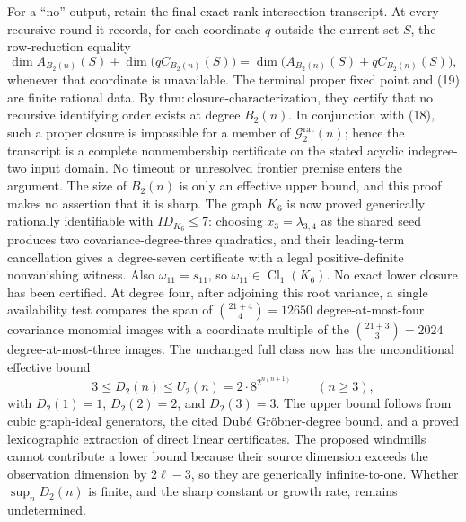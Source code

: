 For a ``no'' output, retain the final exact rank-intersection transcript.  At every recursive round it records, for each coordinate \(q\) outside the current set \(S\), the row-reduction equality
\[
 \dim A_{B_2(n)}(S)+
 \dim\bigl(qC_{B_2(n)}(S)\bigr)
 =\dim\bigl(A_{B_2(n)}(S)+qC_{B_2(n)}(S)\bigr), \tag{19}
\]
whenever that coordinate is unavailable.  The terminal proper fixed point and (19) are finite rational data.  By \(\mathrm{thm:closure\mbox{-}characterization}\), they certify that no recursive identifying order exists at degree \(B_2(n)\).  In conjunction with (18), such a proper closure is impossible for a member of \(\mathcal G_{2}^{\mathrm{rat}}(n)\); hence the transcript is a complete nonmembership certificate on the stated acyclic indegree-two input domain.  No timeout or unresolved frontier premise enters the argument.  The size of \(B_2(n)\) is only an effective upper bound, and this proof makes no assertion that it is sharp.
The graph \(K_6\) is now proved generically rationally identifiable with \(ID_{K_6}\leq7\): choosing \(x_3=\lambda_{3,4}\) as the shared seed produces two covariance-degree-three quadratics, and their leading-term cancellation gives a degree-seven certificate with a legal positive-definite nonvanishing witness.  Also \(\omega_{11}=s_{11}\), so \(\omega_{11}\in\operatorname{Cl}_1(K_6)\).  No exact lower closure has been certified.  At degree four, after adjoining this root variance, a single availability test compares the span of \(\binom{21+4}{4}=12650\) degree-at-most-four covariance monomial images with a coordinate multiple of the \(\binom{21+3}{3}=2024\) degree-at-most-three images.
The unchanged full class now has the unconditional effective bound
\[
 3\leq D_2(n)\leq U_2(n)=2\cdot8^{2^{n(n+1)}}\qquad(n\geq3),
\]
with \(D_2(1)=1\), \(D_2(2)=2\), and \(D_2(3)=3\).  The upper bound follows from cubic graph-ideal generators, the cited Dub\'e Gr\"obner-degree bound, and a proved lexicographic extraction of direct linear certificates.  The proposed windmills cannot contribute a lower bound because their source dimension exceeds the observation dimension by \(2\ell-3\), so they are generically infinite-to-one.  Whether \(\sup_nD_2(n)\) is finite, and the sharp constant or growth rate, remains undetermined.
